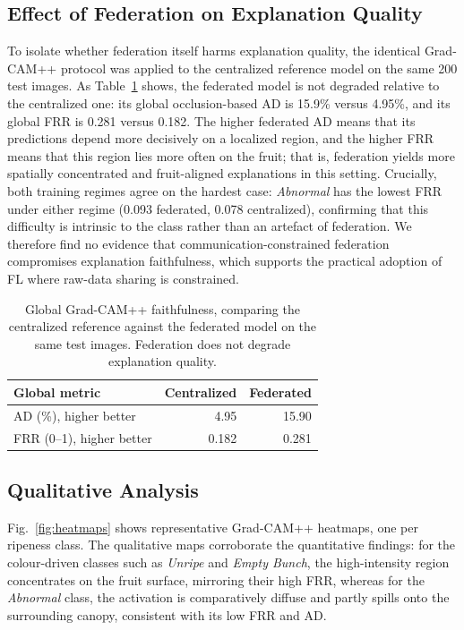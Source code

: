 \documentclass[9pt,twocolumn]{extarticle}
\begin{document}
\subsection{Effect of Federation on Explanation Quality}

To isolate whether federation itself harms explanation quality, the identical Grad-CAM++ protocol was applied to the centralized reference model on the same 200 test images. As Table~\ref{tab:fedvscentral} shows, the federated model is not degraded relative to the centralized one: its global occlusion-based AD is 15.9\% versus 4.95\%, and its global FRR is 0.281 versus 0.182. The higher federated AD means that its predictions depend more decisively on a localized region, and the higher FRR means that this region lies more often on the fruit; that is, federation yields more spatially concentrated and fruit-aligned explanations in this setting. Crucially, both training regimes agree on the hardest case: \emph{Abnormal} has the lowest FRR under either regime (0.093 federated, 0.078 centralized), confirming that this difficulty is intrinsic to the class rather than an artefact of federation. We therefore find no evidence that communication-constrained federation compromises explanation faithfulness, which supports the practical adoption of FL where raw-data sharing is constrained.

\begin{table}[H]
  \centering
  \caption{Global Grad-CAM++ faithfulness, comparing the centralized reference against the federated model on the same test images. Federation does not degrade explanation quality.}
  \label{tab:fedvscentral}
  \small
  \begin{tabular}{lrr}
    \toprule
    Global metric & Centralized & Federated \\
    \midrule
    AD (\%), higher better & 4.95 & 15.90 \\
    FRR (0--1), higher better & 0.182 & 0.281 \\
    \bottomrule
  \end{tabular}
\end{table}

\subsection{Qualitative Analysis}

Fig.~\ref{fig:heatmaps} shows representative Grad-CAM++ heatmaps, one per ripeness class. The qualitative maps corroborate the quantitative findings: for the colour-driven classes such as \emph{Unripe} and \emph{Empty Bunch}, the high-intensity region concentrates on the fruit surface, mirroring their high FRR, whereas for the \emph{Abnormal} class, the activation is comparatively diffuse and partly spills onto the surrounding canopy, consistent with its low FRR and AD.
\end{document}
